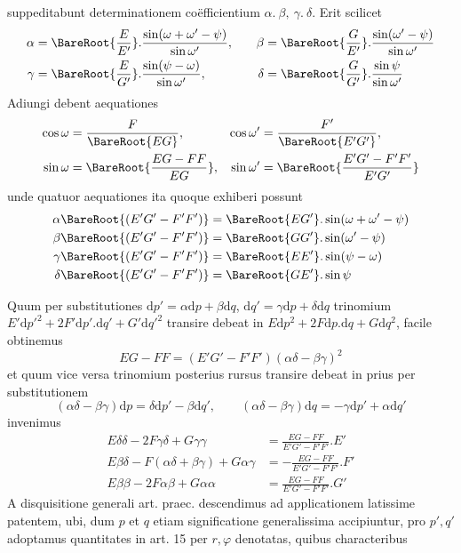 %
suppeditabunt determinationem coëfficientium \(\alpha\mathord{.}\ \beta,\ \gamma\mathord{.}\ \delta\). Erit scilicet
\[
\begin{aligned}
\alpha&=\BareRoot{\frac{E}{E'}}\mathord{.}\frac{\sin(\omega+\omega'-\psi)}{\sin\omega'},&\quad\beta&=\BareRoot{\frac{G}{E'}}\mathord{.}\frac{\sin(\omega'-\psi)}{\sin\omega'}\\
\gamma&=\BareRoot{\frac{E}{G'}}\mathord{.}\frac{\sin(\psi-\omega)}{\sin\omega'},&\delta&=\BareRoot{\frac{G}{G'}}\mathord{.}\frac{\sin\psi}{\sin\omega'}
\end{aligned}
\]
Adiungi debent aequationes
\[
\begin{aligned}
\cos\omega&=\frac{F}{\BareRoot{EG}},&\cos\omega'&=\frac{F'}{\BareRoot{E'G'}},\\
\sin\omega&=\BareRoot{\frac{EG-FF}{EG}},&\sin\omega'&=\BareRoot{\frac{E'G'-F'F'}{E'G'}}
\end{aligned}
\]
unde quatuor aequationes ita quoque exhiberi possunt
\[
\begin{aligned}
\alpha\BareRoot{(E'G'-F'F')}&=\BareRoot{EG'}\mathord{.}\sin(\omega+\omega'-\psi)\\
\beta\BareRoot{(E'G'-F'F')}&=\BareRoot{GG'}\mathord{.}\sin(\omega'-\psi)\\
\gamma\BareRoot{(E'G'-F'F')}&=\BareRoot{EE'}\mathord{.}\sin(\psi-\omega)\\
\delta\BareRoot{(E'G'-F'F')}&=\BareRoot{GE'}\mathord{.}\sin\psi
\end{aligned}
\]

Quum per substitutiones \(\mathrm{d}p'=\alpha\mathrm{d}p+\beta\mathrm{d}q\), \(\mathrm{d}q'=\gamma\mathrm{d}p+\delta\mathrm{d}q\) trinomium \(E'\mathrm{d}p'^2+2F'\mathrm{d}p'\mathord{.}\mathrm{d}q'+G'\mathrm{d}q'^2\) transire debeat in \(E\mathrm{d}p^2+2F\mathrm{d}p\mathord{.}\mathrm{d}q+G\mathrm{d}q^2\), facile obtinemus
\[
EG-FF=(E'G'-F'F')(\alpha\delta-\beta\gamma)^2
\]
et quum vice versa trinomium posterius rursus transire debeat in prius per substitutionem
\[
(\alpha\delta-\beta\gamma)\mathrm{d}p=\delta\mathrm{d}p'-\beta\mathrm{d}q',\qquad(\alpha\delta-\beta\gamma)\mathrm{d}q=-\gamma\mathrm{d}p'+\alpha\mathrm{d}q'
\]
invenimus
\[
\begin{aligned}
E\delta\delta-2F\gamma\delta+G\gamma\gamma&=\frac{EG-FF}{E'G'-F'F'}\mathord{.}E'\\
E\beta\delta-F(\alpha\delta+\beta\gamma)+G\alpha\gamma&=-\frac{EG-FF}{E'G'-F'F'}\mathord{.}F'\\
E\beta\beta-2F\alpha\beta+G\alpha\alpha&=\frac{EG-FF}{E'G'-F'F'}\mathord{.}G'
\end{aligned}
\]
A disquisitione generali art. praec. descendimus ad applicationem latissime patentem, ubi, dum \(p\) et \(q\) etiam significatione generalissima accipiuntur, pro \(p',q'\) adoptamus quantitates in art. 15 per \(r,\varphi\) denotatas, quibus characteribus
